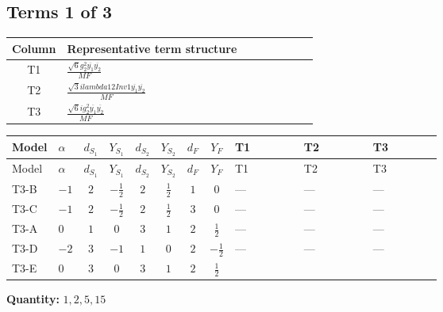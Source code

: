 \documentclass[8pt]{article}
\begin{document}
\begin{landscape}
\subsection*{Terms 1 of 3}
\begin{center}
\begin{tabular}{@{}c >{\raggedright\arraybackslash}p{0.82\linewidth}@{}}
\toprule
Column & Representative term structure \\
\midrule
T1 & \(\displaystyle \frac{\sqrt{6} g_{2}^{2} \overline{y_{1}} \overline{y_{2}}}{MF}\) \\
\midrule
T2 & \(\displaystyle \frac{\sqrt{3} i lambda12Inv1 \overline{y_{1}} \overline{y_{2}}}{MF}\) \\
\midrule
T3 & \(\displaystyle \frac{\sqrt{6} i g_{2}^{2} \overline{y_{1}} \overline{y_{2}}}{MF}\) \\
\midrule
\bottomrule
\end{tabular}
\end{center}
\smallskip
\tiny
\begin{longtable}{@{}llcccccc >{\raggedright\arraybackslash}p{0.21\linewidth} >{\raggedright\arraybackslash}p{0.21\linewidth} >{\raggedright\arraybackslash}p{0.21\linewidth}@{}}
\toprule
Model & $\alpha$ & $d_{S_1}$ & $Y_{S_1}$ & $d_{S_2}$ & $Y_{S_2}$ & $d_F$ & $Y_F$ & T1 & T2 & T3 \\
\midrule
\endfirsthead
\toprule
Model & $\alpha$ & $d_{S_1}$ & $Y_{S_1}$ & $d_{S_2}$ & $Y_{S_2}$ & $d_F$ & $Y_F$ & T1 & T2 & T3 \\
\midrule
\endhead
T3-B & $-1$ & $2$ & $-\frac{1}{2}$ & $2$ & $\frac{1}{2}$ & $1$ & $0$ & --- & --- & --- \\
\midrule
T3-C & $-1$ & $2$ & $-\frac{1}{2}$ & $2$ & $\frac{1}{2}$ & $3$ & $0$ & --- & --- & --- \\
\midrule
T3-A & $0$ & $1$ & $0$ & $3$ & $1$ & $2$ & $\frac{1}{2}$ & --- & --- & --- \\
\midrule
T3-D & $-2$ & $3$ & $-1$ & $1$ & $0$ & $2$ & $-\frac{1}{2}$ & --- & --- & --- \\
\midrule
T3-E & $0$ & $3$ & $0$ & $3$ & $1$ & $2$ & $\frac{1}{2}$ & \scriptsize\adjustbox{max width=\linewidth}{$\begin{gathered} - \frac{\sqrt{6} g_{2}^{2} \overline{y_{1}} \overline{y_{2}}}{6 MF}\end{gathered}$} & \scriptsize\adjustbox{max width=\linewidth}{$\begin{gathered} - \frac{\sqrt{3} i lambda12Inv1 \overline{y_{1}} \overline{y_{2}}}{6 MF}\end{gathered}$} & \scriptsize\adjustbox{max width=\linewidth}{$\begin{gathered} \frac{\sqrt{6} i g_{2}^{2} \overline{y_{1}} \overline{y_{2}}}{6 MF}\end{gathered}$} \\
\midrule
\bottomrule
\end{longtable}
\clearpage
\noindent\textbf{Quantity: }$\mathrm{1,2,5,15}$\par\smallskip

\end{landscape}
\end{document}
